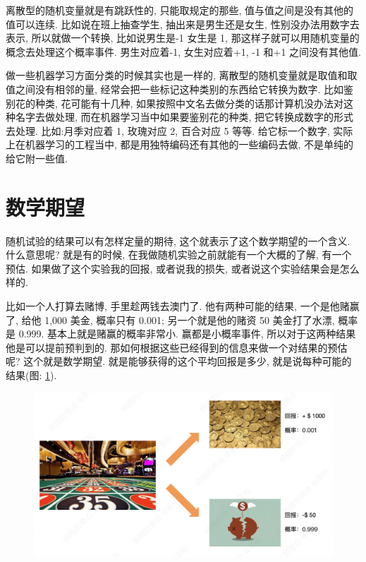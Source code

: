 离散型的随机变量就是有跳跃性的, 只能取规定的那些, 值与值之间是没有其他的值可以连续. 比如说在班上抽查学生, 抽出来是男生还是女生, 性别没办法用数字去表示, 所以就做一个转换, 比如说男生是-1 女生是 1, 那这样子就可以用随机变量的概念去处理这个概率事件. 男生对应着-1, 女生对应着+1, -1 和+1 之间没有其他值. 

做一些机器学习方面分类的时候其实也是一样的, 离散型的随机变量就是取值和取值之间没有相邻的量, 经常会把一些标记这种类别的东西给它转换为数字. 比如鉴别花的种类, 花可能有十几种, 如果按照中文名去做分类的话那计算机没办法对这种名字去做处理, 而在机器学习当中如果要鉴别花的种类, 把它转换成数字的形式去处理. 比如:月季对应着 1, 玫瑰对应 2, 百合对应 5 等等. 给它标一个数字, 实际上在机器学习的工程当中, 都是用独特编码还有其他的一些编码去做, 不是单纯的给它附一些值. 

\section{数学期望}

随机试验的结果可以有怎样定量的期待, 这个就表示了这个数学期望的一个含义. 什么意思呢? 就是有的时候, 在我做随机实验之前就能有一个大概的了解, 有一个预估. 如果做了这个实验我的回报, 或者说我的损失, 或者说这个实验结果会是怎么样的. 

比如一个人打算去赌博, 手里趁两钱去澳门了. 他有两种可能的结果, 一个是他赌赢了, 给他 1,000 美金, 概率只有 0.001; 另一个就是他的赌资 50 美金打了水漂, 概率是 0.999. 基本上就是赌赢的概率非常小. 赢都是小概率事件, 所以对于这两种结果他是可以提前预判到的. 那如何根据这些已经得到的信息来做一个对结果的预估呢? 这个就是数学期望. 就是能够获得的这个平均回报是多少, 就是说每种可能的结果(图: \ref{fig:img5_3}). 

\begin{figure}[ht]
  \centering
  \includegraphics[width=1\textwidth]{asset/86da64b2-45f2-42c2-add4-d7db67f5cf82.png}
  \caption{}
  \label{fig:img5_3}
\end{figure}

